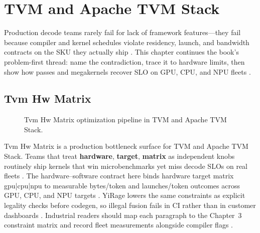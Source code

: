\chapter{TVM and Apache TVM Stack}
\label{chap:ch16}

Production decode teams rarely fail for lack of framework features---they fail because compiler and kernel schedules violate residency, launch, and bandwidth contracts on the SKU they actually ship \citep{patel2025llminference,nvidia2022hopper}. This chapter continues the book's problem-first thread: name the contradiction, trace it to hardware limits, then show how passes and megakernels recover SLO on GPU, CPU, and NPU fleets \citep{taxbreak2026,semianalysis2024tma}.

\section{Tvm Hw Matrix}
\label{sec:tvm_hw_matrix}
\begin{figure}[t]
\centering
{}
\caption{Tvm Hw Matrix optimization pipeline in TVM and Apache TVM Stack.}
\label{fig:tvm_hw_matrix_pipeline}
\end{figure}


Tvm Hw Matrix is a production bottleneck surface for TVM and Apache TVM Stack. Teams that treat \textbf{hardware}, \textbf{target}, \textbf{matrix} as independent knobs routinely ship kernels that win microbenchmarks yet miss decode SLOs on real fleets \citep{patel2025llminference,nvidia2022hopper}. The hardware--software contract here binds hardware target matrix gpu|cpu|npu to measurable bytes/token and launches/token outcomes across GPU, CPU, and NPU targets \citep{taxbreak2026,semianalysis2024tma}. YiRage lowers the same constraints as explicit legality checks before codegen, so illegal fusion fails in CI rather than in customer dashboards \citep{memoryfloor2026,amd2024xdna}. Industrial readers should map each paragraph to the Chapter~3 constraint matrix and record fleet measurements alongside compiler flags \citep{nvidia2022hopper,amd2024aie}.

